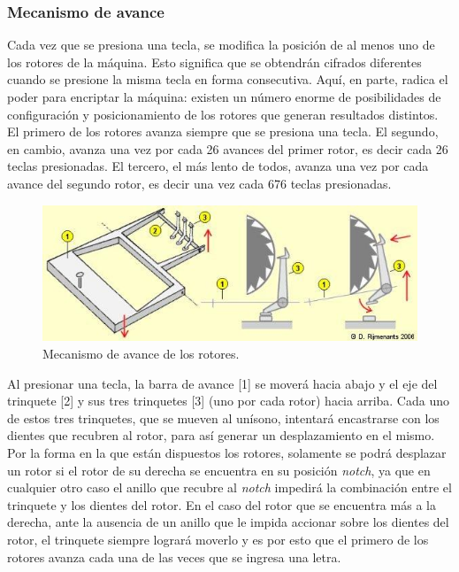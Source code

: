 \documentclass[a4paper,10pt]{article}
\begin{document}
\subsubsection{Mecanismo de avance}

Cada vez que se presiona una tecla, se modifica la posición de al menos uno de los rotores de la máquina. Esto significa que se obtendrán cifrados diferentes cuando se presione la misma tecla en forma consecutiva. Aquí, en parte, radica el poder para encriptar la máquina: existen un número enorme de posibilidades de configuración y posicionamiento de los rotores que generan resultados distintos.
El primero de los rotores avanza siempre que se presiona una tecla. El segundo, en cambio, avanza una vez por cada 26 avances del primer rotor, es decir cada 26 teclas presionadas. El tercero, el más lento de todos, avanza una vez por cada avance del segundo rotor, es decir una vez cada 676 teclas presionadas.


\begin{figure}[H]
    \centering
    \includegraphics[scale=2]{stepping-mech.jpg}
    \caption{Mecanismo de avance de los rotores.\cite{rijmenants}}
    \label{fig:my_label}
\end{figure}

Al presionar una tecla, la barra de avance [1] se moverá hacia abajo y el eje del trinquete [2] y sus tres trinquetes [3] (uno por cada rotor) hacia arriba. Cada uno de estos tres trinquetes, que se mueven al unísono, intentará encastrarse con los dientes que recubren al rotor, para así generar un desplazamiento en el mismo. Por la forma en la que están dispuestos los rotores, solamente se podrá desplazar un rotor si el rotor de su derecha se encuentra en su posición \textit{notch}, ya que en cualquier otro caso el anillo que recubre al \textit{notch} impedirá la combinación entre el trinquete y los dientes del rotor. En el caso del rotor que se encuentra más a la derecha, ante la ausencia de un anillo que le impida accionar sobre los dientes del rotor, el trinquete siempre logrará moverlo y es por esto que el primero de los rotores avanza cada una de las veces que se ingresa una letra. 
\end{document}
